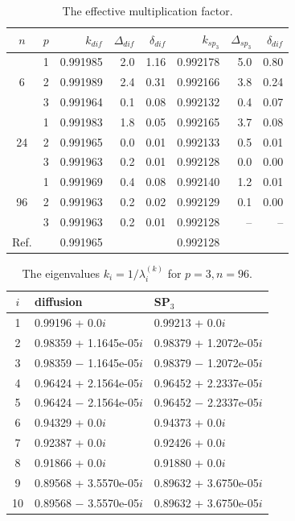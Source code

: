 \documentclass[authoryear]{elsarticle}
\begin{document}
\begin{table}[h]
\caption{The effective multiplication factor.}
\label{tab:hwr_lambda}
\begin{center}
\begin{tabular}{c c r r r r r r}
\hline
$n$ & $p$ & $k_{dif}$ & $\Delta_{dif}$ & $\delta_{dif}$ &$k_{sp_3}$& $\Delta_{sp_3}$ & $\delta_{dif}$ \\
\hline
	& 1	& 0.991985&  2.0& 1.16&0.992178&   5.0& 0.80\\
6	& 2	& 0.991989&  2.4& 0.31&0.992166&   3.8& 0.24\\
	& 3	& 0.991964&  0.1& 0.08&0.992132&   0.4& 0.07\\
\hline
	& 1	& 0.991983&  1.8& 0.05&0.992165&   3.7& 0.08\\
24& 2	& 0.991965&  0.0& 0.01&0.992133&   0.5& 0.01\\
	& 3	& 0.991963&  0.2& 0.01&0.992128&   0.0& 0.00\\ 
\hline
	& 1	& 0.991969&  0.4& 0.08&0.992140&   1.2& 0.01\\
96& 2	& 0.991963&  0.2& 0.02&0.992129&   0.1& 0.00\\
	& 3	& 0.991963&  0.2& 0.01&0.992128&    --& --\\ 
\hline
Ref.&   & 0.991965&    & & 0.992128 & & \\ 
\hline
\end{tabular}
\end{center}
\end{table}

\begin{table}[h]
\caption{The eigenvalues $k_i=1/\lambda_i^{(k)}$ for $p=3, n=96$.}
\label{tab:hwr_lambda_10}
\begin{center}
\begin{tabular}{c l l }
\hline
$i$ & diffusion & SP$_3$  \\
\hline
1 & 0.99196 + 0.0$i$   & 0.99213 + 0.0$i$\\
2 & 0.98359 + 1.1645e-05$i$   & 0.98379 + 1.2072e-05$i$\\
3 & 0.98359 $-$ 1.1645e-05$i$ & 0.98379 $-$ 1.2072e-05$i$\\
4 & 0.96424 + 2.1564e-05$i$   & 0.96452 + 2.2337e-05$i$\\
5 & 0.96424 $-$ 2.1564e-05$i$ & 0.96452 $-$ 2.2337e-05$i$\\
6 & 0.94329 + 0.0$i$   & 0.94373 + 0.0$i$\\
7 & 0.92387 + 0.0$i$   & 0.92426 + 0.0$i$\\
8 & 0.91866 + 0.0$i$   & 0.91880 + 0.0$i$\\
9 & 0.89568 + 3.5570e-05$i$   & 0.89632 + 3.6750e-05$i$\\
10 & 0.89568 $-$ 3.5570e-05$i$& 0.89632 + 3.6750e-05$i$\\
\hline
\end{tabular}
\end{center}
\end{table}
\end{document}
